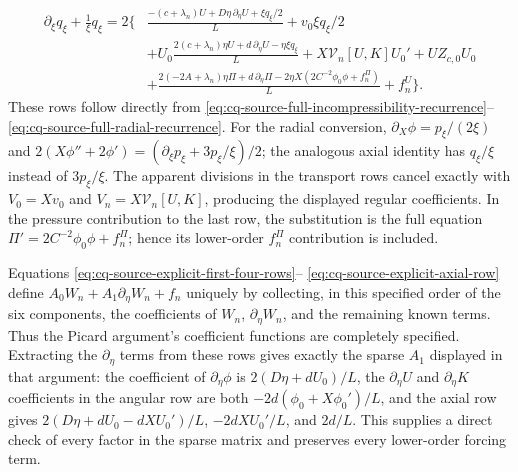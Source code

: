 \begin{equation}
\begin{split}
 \partial_\xi q_\xi+\frac1\xi q_\xi
 =2\biggl\{&
 \frac{-(c+\lambda_n)U+D\eta\,\partial_\eta U
                                     +\xi q_\xi/2}{L}
                       +v_0\xi q_\xi/2\\
 &+U_0\frac{2(c+\lambda_n)\eta U+d\,\partial_\eta U
                                           -\eta\xi q_\xi}{L}
 +X\mathcal V_n[U,K]U_0'+U Z_{c,0}U_0\\
 &+\frac{2(-2A+\lambda_n)\eta\Pi+d\,\partial_\eta\Pi
              -2\eta X(2C^{-2}\phi_0\phi+f_n^\Pi)}L
                                      +f_n^U\biggr\}.
\end{split}
 \label{eq:cq-source-explicit-axial-row}
\end{equation}
These rows follow directly from
\eqref{eq:cq-source-full-incompressibility-recurrence}--%
\eqref{eq:cq-source-full-radial-recurrence}.
For the radial conversion,
$\partial_X\phi=p_\xi/(2\xi)$ and
$2(X\phi''+2\phi')=(\partial_\xi p_\xi+3p_\xi/\xi)/2$;
the analogous axial identity has $q_\xi/\xi$ instead of
$3p_\xi/\xi$. The apparent divisions in the transport rows
cancel exactly with $V_0=Xv_0$ and
$V_n=X\mathcal V_n[U,K]$, producing the displayed regular
coefficients. In the pressure contribution to the last row,
the substitution is the full equation
$\Pi'=2C^{-2}\phi_0\phi+f_n^\Pi$; hence its lower-order
$f_n^\Pi$ contribution is included.

Equations \eqref{eq:cq-source-explicit-first-four-rows}--%
\eqref{eq:cq-source-explicit-axial-row} define $A_0W_n+
A_1\partial_\eta W_n+f_n$ uniquely by collecting, in this
specified order of the six components, the coefficients of
$W_n$, $\partial_\eta W_n$, and the remaining known terms.
Thus the Picard argument's coefficient functions are
completely specified. Extracting the $\partial_\eta$ terms
from these rows gives exactly the sparse $A_1$ displayed
in that argument: the coefficient of $\partial_\eta\phi$
is $2(D\eta+dU_0)/L$, the $\partial_\eta U$ and
$\partial_\eta K$ coefficients in the angular row are both
$-2d(\phi_0+X\phi_0')/L$, and the axial row gives
$2(D\eta+dU_0-dXU_0')/L$, $-2dXU_0'/L$, and $2d/L$.
This supplies a direct check of every factor in the sparse
matrix and preserves every lower-order forcing term.


